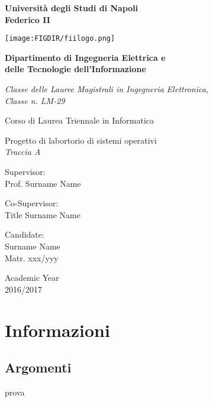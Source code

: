 \documentclass[12pt, a4paper]{report}
\begin{document}
\pagestyle{empty}
\begin{center}


{\bfseries\Huge Università degli Studi di Napoli\\}
\vspace{2.54mm}
{\bfseries\Huge Federico II\\}
\vspace{5mm}

\centerline{\mbox{\texttt{[image: \\FIGDIR/fiilogo.png]}}}

\medskip
{\bfseries\LARGE Dipartimento di Ingegneria Elettrica e\\}
\vspace{2.54mm}
{\bfseries\LARGE delle Tecnologie dell'Informazione\\}
\vspace{2.54mm}

{\emph{\large Classe delle Lauree Magistrali in Ingegneria Elettronica,\\}}
{\emph{\large Classe n. LM-29\\}}
\vspace{2.54mm}

{\large Corso di Laurea Triennale in Informatica\\}
\vspace{5mm}



\vfill
{\Large Progetto di labortorio di sistemi operativi\\}
\vspace{4mm}
{\emph{\LARGE Traccia A\\}}		%
\vspace{4mm}

\vfill

\begin{multicols}{2}
	{\large Supervisor:\\}
	Prof. Surname Name\\
	\vspace{5mm}
	
	{\large Co-Supervisor:\\}
	Title Surname Name\\
	\vspace{5mm}
	
	{\large Candidate:\\}
	Surname Name\\
	Matr. xxx/yyy\\
	\vspace{10mm}
\end{multicols}

\vfill

{\large Academic Year\\ 2016/2017}

\end{center}






\newpage
\tableofcontents
\newpage
{}
\section{Informazioni}

\subsection{Argomenti}
   prova
 
\end{document}
